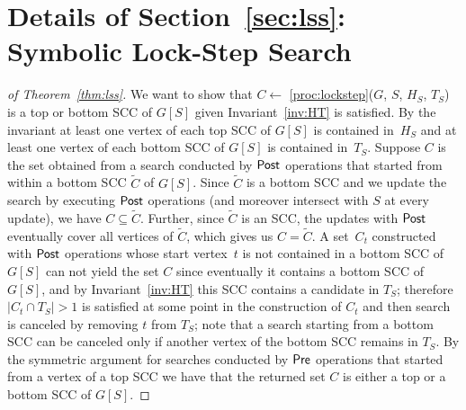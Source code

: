 \section{Details of Section~\ref{sec:lss}: Symbolic Lock-Step Search}\label{sec:applss}

\begin{proof}[of Theorem~\ref{thm:lss}]

\smallskip{}
We want to show that $C \gets $ \ref{proc:lockstep}($G$, $S$, $H_S$, $T_S$) is
a top or bottom SCC of $G[S]$ given Invariant~\ref{inv:HT} is satisfied. 
By the invariant at least one vertex of each top SCC of $G[S]$ is contained in~$H_S$
and at least one vertex of each bottom SCC of $G[S]$ is contained in~$T_S$.
Suppose $C$ is the set obtained from a search conducted by $\mathsf{Post}$ operations 
that started from within a
bottom SCC $\tilde{C}$ of $G[S]$. Since $\tilde{C}$ is a bottom SCC
and we update the search by executing $\mathsf{Post}$ operations (and moreover
intersect with $S$ at every update), we have $C \subseteq \tilde{C}$. Further,
since $\tilde{C}$ is an SCC, the updates
with $\mathsf{Post}$ eventually cover all vertices of $\tilde{C}$, which gives
us $C = \tilde{C}$. A set~$C_t$ constructed with $\mathsf{Post}$ operations whose start vertex~$t$
is not contained in a bottom SCC of $G[S]$ can not yield the set $C$ since
eventually it contains a bottom SCC of $G[S]$, and by
Invariant~\ref{inv:HT} this SCC contains a candidate in $T_S$; therefore 
$|C_t \cap T_S| > 1$ is satisfied at some point in the construction of $C_t$ and
then search is canceled by removing $t$ from $T_S$; note that a search starting 
from a bottom SCC can be canceled only if another vertex of the bottom SCC remains in $T_S$. By the
symmetric argument for searches conducted by $\mathsf{Pre}$ operations that
started from a vertex of a top SCC we have that the returned set $C$ is either 
a top or a bottom SCC of $G[S]$.


\end{proof}
